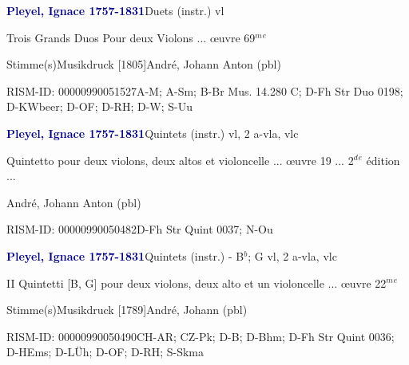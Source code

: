 \documentclass[twocolumn]{book}
\begin{document}
\par \vspace{7pt} \textcolor{darkblue}{\textbf{Pleyel, Ignace  1757-1831}}\hfillplus{\textbf{[312]}}\newline Duets (instr.) vl
\par \begin{itshape}Trois Grands Duos Pour deux Violons ... œuvre 69$^m$$^e$\end{itshape} 
\par \textcolor{darkblue}{}  Stimme(s)\newline Musikdruck  [1805]\newline André, Johann Anton  (pbl)
\par RISM-ID: 00000990051527\newline A-M; A-Sm; B-Br  Mus. 14.280 C; D-Fh  Str Duo 0198; D-KWbeer; D-OF; D-RH; D-W; S-Uu
\par \vspace{7pt} \textcolor{darkblue}{\textbf{Pleyel, Ignace  1757-1831}}\hfillplus{\textbf{[313]}}\newline Quintets (instr.) vl, 2 a-vla, vlc
\par \begin{itshape}Quintetto pour deux violons, deux altos et violoncelle ... œuvre 19 ... 2$^d$$^e$ édition ...\end{itshape} \newline André, Johann Anton  (pbl)
\par RISM-ID: 00000990050482\newline D-Fh  Str Quint 0037; N-Ou
\par \vspace{7pt} \textcolor{darkblue}{\textbf{Pleyel, Ignace  1757-1831}}\hfillplus{\textbf{[314]}}\newline Quintets (instr.) - B$^b$; G vl, 2 a-vla, vlc
\par \begin{itshape}II Quintetti [B, G] pour deux violons, deux alto et un violoncelle ... œuvre 22$^m$$^e$\end{itshape} 
\par \textcolor{darkblue}{}  Stimme(s)\newline Musikdruck  [1789]\newline André, Johann  (pbl)
\par RISM-ID: 00000990050490\newline CH-AR; CZ-Pk; D-B; D-Bhm; D-Fh  Str Quint 0036; D-HEms; D-LÜh; D-OF; D-RH; S-Skma
\end{document}
